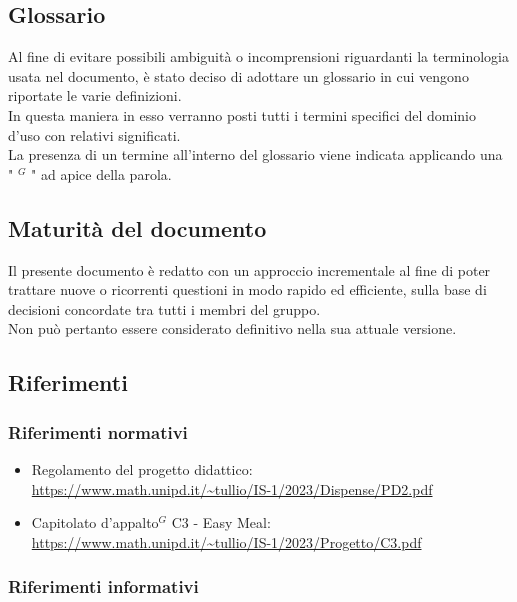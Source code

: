     \subsection{Glossario}

    Al fine di evitare possibili ambiguità o incomprensioni riguardanti la terminologia usata nel documento, è stato deciso di adottare un glossario in cui vengono riportate le varie definizioni. \\
    In questa maniera in esso verranno posti tutti i termini specifici del dominio d’uso con relativi significati. \\
    La presenza di un termine all’interno del glossario viene indicata applicando una " $^{G}$ " ad apice della parola.


    \subsection{Maturità del documento}

    Il presente documento è redatto con un approccio incrementale al fine di poter trattare nuove o ricorrenti questioni in modo rapido ed efficiente, sulla base di decisioni concordate tra tutti i membri del gruppo. \\
    Non può pertanto essere considerato definitivo nella sua attuale versione.

    \subsection{Riferimenti}

        \subsubsection{Riferimenti normativi}

        \begin{itemize}
            \item Regolamento del progetto didattico: \\
            \url{https://www.math.unipd.it/~tullio/IS-1/2023/Dispense/PD2.pdf}
            \item Capitolato d’appalto$^{G}$ C3 - Easy Meal: \\
            \url{https://www.math.unipd.it/~tullio/IS-1/2023/Progetto/C3.pdf}
        \end{itemize}

        \subsubsection{Riferimenti informativi}

